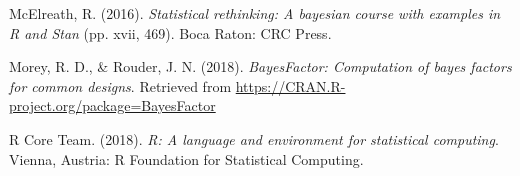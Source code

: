 \documentclass[man,floatsintext]{apa6}
\begin{document}
\hypertarget{ref-rethinking}{}
McElreath, R. (2016). \emph{Statistical rethinking: A bayesian course
with examples in R and Stan} (pp. xvii, 469). Boca Raton: CRC Press.

\hypertarget{ref-R-BayesFactor}{}
Morey, R. D., \& Rouder, J. N. (2018). \emph{BayesFactor: Computation of
bayes factors for common designs}. Retrieved from
\url{https://CRAN.R-project.org/package=BayesFactor}

\hypertarget{ref-R-base}{}
R Core Team. (2018). \emph{R: A language and environment for statistical
computing}. Vienna, Austria: R Foundation for Statistical Computing.

\endgroup
\end{document}
